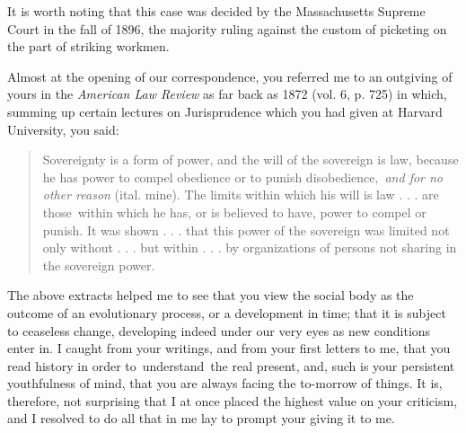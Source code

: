 \documentclass[openany,nobib]{tufte-book}
\begin{document}
\noindent It is worth noting that this case was decided by the Massachusetts
Supreme Court in the fall of 1896, the majority ruling against the
custom of picketing on the part of striking workmen.~

Almost at the opening of our correspondence, you referred me to an
outgiving of yours in the \emph{American Law Review} as far back as 1872
(vol. 6, p. 725) in which, summing up certain lectures on Jurisprudence
which you had given at Harvard University, you said:~

\begin{quote}
Sovereignty is a form of power, and the will of the sovereign is law,
because he has power to compel obedience or to punish
disobedience,~\emph{and for no other reason} (ital. mine). The limits
within which his will is law . . . are those~within which he has, or is
believed to have, power to compel or punish. It was shown . . . that
this power of the sovereign was limited not only without . . . but
within . . . by organizations of persons not sharing in the sovereign
power.
\end{quote}

The above extracts helped me to see that you view the social body as the
outcome of an evolutionary process, or a development in time; that it is
subject to ceaseless change, developing indeed under our very eyes as
new conditions enter in. I caught from your writings, and from your
first letters to me, that you read history in order to~understand~the
real present, and, such is your persistent youthfulness of mind, that
you are always facing the to-morrow of things. It is, therefore, not
surprising that I at once placed the highest value on your criticism,
and I resolved to do all that in me lay to prompt your giving it to
me.~~
\end{document}

